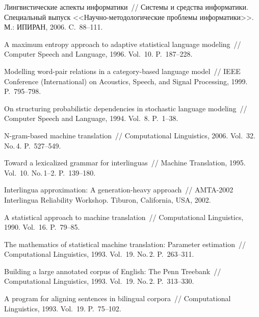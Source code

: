 \begin{multicols}{2}
{{\begin{thebibliography}{99}
Лингвистические аспекты информатики~// Системы и
средства информатики. Специальный выпуск <<Научно-методологические
проблемы информатики>>. М.: ИПИРАН, 2006. C.~88--111.

A maximum entropy approach to adaptive statistical language
modeling~// Computer Speech and Language, 1996. Vol.~10. P.~187--228.

Modelling word-pair relations in a
category-based language model~// IEEE Conference
(International) on Acoustics, Speech, and Signal Processing, 1999. P.~795--798.

On structuring probabilistic dependencies
in stochastic language modeling~// Computer Speech and Language, 1994.
Vol.~8. P.~1--38.

 N-gram-based machine translation~//
Computational Linguistics, 2006. Vol.~32. No.\,4. P.~527--549.

Toward a lexicalized grammar for
interlinguas~// Machine Translation, 1995. Vol.~10. No.\,1--2. P.~139--180.

Interlingua approximation: A generation-heavy approach~//
AMTA-2002 Interlingua Reliability Workshop. Tiburon,
California, USA, 2002.

A statistical approach to machine
translation~// Computational Linguistics, 1990. Vol.~16. P.~79--85.

The mathematics of statistical machine translation: Parameter estimation~//
Computational Linguistics, 1993. Vol.~19. No.\,2. P.~263--311.

Building a large
annotated corpus of English: The Penn Treebank~//
Computational Linguistics, 1993. Vol.~19. No.\,2. P.~313--330.

A program for aligning
sentences in bilingual corpora~// Computational Linguistics, 1993.
Vol.~19. P.~75--102.


\end{thebibliography}}}
\end{multicols}
